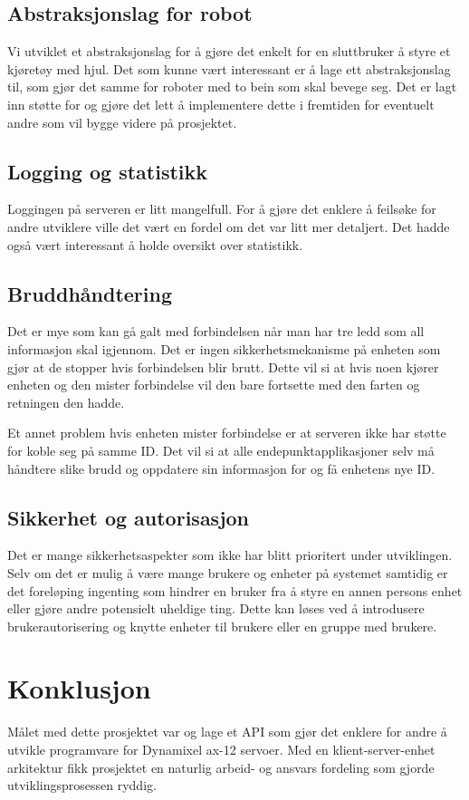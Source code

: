 \documentclass[12pt]{report}
\begin{document}
\section{Abstraksjonslag for robot}
Vi utviklet et abstraksjonslag for å gjøre det enkelt for en sluttbruker å styre et kjøretøy med hjul. Det som kunne vært interessant er å lage ett abstraksjonslag til, som gjør det samme for roboter med to bein som skal bevege seg. Det er lagt inn støtte for og gjøre det lett å implementere dette i fremtiden for eventuelt andre som vil bygge videre på prosjektet.

\section{Logging og statistikk}
Loggingen på serveren er litt mangelfull. For å gjøre det enklere å feilsøke for andre utviklere ville det vært en fordel om det var litt mer detaljert. Det hadde også vært interessant å holde oversikt over statistikk.

\section{Bruddhåndtering}
Det er mye som kan gå galt med forbindelsen når man har tre ledd som all informasjon skal igjennom. Det er ingen sikkerhetsmekanisme på enheten som gjør at de stopper hvis forbindelsen blir brutt. Dette vil si at hvis noen kjører enheten og den mister forbindelse vil den bare fortsette med den farten og retningen den hadde.

Et annet problem hvis enheten mister forbindelse er at serveren ikke har støtte for koble seg på samme ID. Det vil si at alle endepunktapplikasjoner selv må håndtere slike brudd og oppdatere sin informasjon for og få enhetens nye ID.

\section{Sikkerhet og autorisasjon}
Det er mange sikkerhetsaspekter som ikke har blitt prioritert under utviklingen. Selv om det er mulig å være mange brukere og enheter på systemet samtidig er det foreløping ingenting som hindrer en bruker fra å styre en annen persons enhet eller gjøre andre potensielt uheldige ting. Dette kan løses ved å introdusere brukerautorisering og knytte enheter til brukere eller en gruppe med brukere. 

\clearpage

\chapter{Konklusjon}
Målet med dette prosjektet var og lage et API som gjør det enklere for andre å utvikle programvare for Dynamixel ax-12 servoer. Med en klient-server-enhet arkitektur fikk prosjektet en naturlig arbeid- og ansvars fordeling som gjorde utviklingsprosessen ryddig. 
\end{document}
